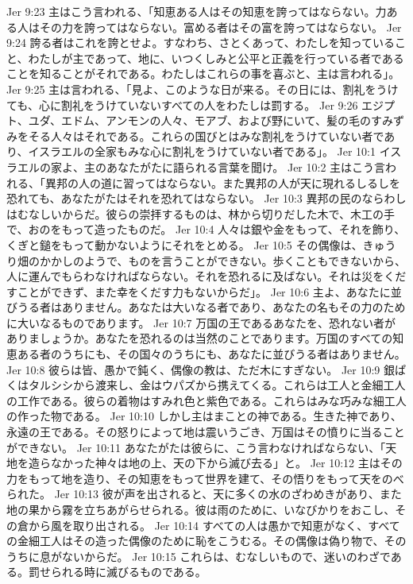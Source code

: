 Jer 9:23  主はこう言われる、「知恵ある人はその知恵を誇ってはならない。力ある人はその力を誇ってはならない。富める者はその富を誇ってはならない。
Jer 9:24  誇る者はこれを誇とせよ。すなわち、さとくあって、わたしを知っていること、わたしが主であって、地に、いつくしみと公平と正義を行っている者であることを知ることがそれである。わたしはこれらの事を喜ぶと、主は言われる」。
Jer 9:25  主は言われる、「見よ、このような日が来る。その日には、割礼をうけても、心に割礼をうけていないすべての人をわたしは罰する。
Jer 9:26  エジプト、ユダ、エドム、アンモンの人々、モアブ、および野にいて、髪の毛のすみずみをそる人々はそれである。これらの国びとはみな割礼をうけていない者であり、イスラエルの全家もみな心に割礼をうけていない者である」。
Jer 10:1  イスラエルの家よ、主のあなたがたに語られる言葉を聞け。
Jer 10:2  主はこう言われる、「異邦の人の道に習ってはならない。また異邦の人が天に現れるしるしを恐れても、あなたがたはそれを恐れてはならない。
Jer 10:3  異邦の民のならわしはむなしいからだ。彼らの崇拝するものは、林から切りだした木で、木工の手で、おのをもって造ったものだ。
Jer 10:4  人々は銀や金をもって、それを飾り、くぎと鎚をもって動かないようにそれをとめる。
Jer 10:5  その偶像は、きゅうり畑のかかしのようで、ものを言うことができない。歩くこともできないから、人に運んでもらわなければならない。それを恐れるに及ばない。それは災をくだすことができず、また幸をくだす力もないからだ」。
Jer 10:6  主よ、あなたに並びうる者はありません。あなたは大いなる者であり、あなたの名もその力のために大いなるものであります。
Jer 10:7  万国の王であるあなたを、恐れない者がありましょうか。あなたを恐れるのは当然のことであります。万国のすべての知恵ある者のうちにも、その国々のうちにも、あなたに並びうる者はありません。
Jer 10:8  彼らは皆、愚かで鈍く、偶像の教は、ただ木にすぎない。
Jer 10:9  銀ぱくはタルシシから渡来し、金はウパズから携えてくる。これらは工人と金細工人の工作である。彼らの着物はすみれ色と紫色である。これらはみな巧みな細工人の作った物である。
Jer 10:10  しかし主はまことの神である。生きた神であり、永遠の王である。その怒りによって地は震いうごき、万国はその憤りに当ることができない。
Jer 10:11  あなたがたは彼らに、こう言わなければならない、「天地を造らなかった神々は地の上、天の下から滅び去る」と。
Jer 10:12  主はその力をもって地を造り、その知恵をもって世界を建て、その悟りをもって天をのべられた。
Jer 10:13  彼が声を出されると、天に多くの水のざわめきがあり、また地の果から霧を立ちあがらせられる。彼は雨のために、いなびかりをおこし、その倉から風を取り出される。
Jer 10:14  すべての人は愚かで知恵がなく、すべての金細工人はその造った偶像のために恥をこうむる。その偶像は偽り物で、そのうちに息がないからだ。
Jer 10:15  これらは、むなしいもので、迷いのわざである。罰せられる時に滅びるものである。

